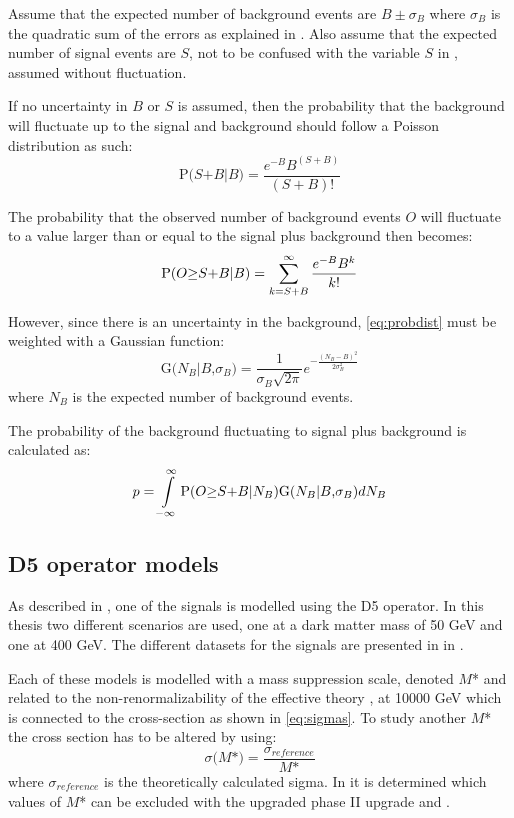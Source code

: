 Assume that the expected number of background events are $B \pm \sigma_B$ where $\sigma_B$ is the quadratic sum of the errors as explained in . Also assume that the expected number of signal events are $S$, not to be confused with the variable $S$ in , assumed without fluctuation. 

If no uncertainty in $B$ or $S$ is assumed, then the probability that the background will fluctuate up to the signal and background should follow a Poisson distribution as such:
\begin{equation}
\text{P($S$+$B$|$B$)}=\frac{e^{-B}B^{(S+B)}}{(S+B)!}
\end{equation} 

The probability that the observed number of background events $O$ will fluctuate to a value larger than or equal to the signal plus background then becomes:
\begin{equation}\label{eq:probdist}
\text{P($O$$ \geq$$S$+$B$|$B$)} =\sum_{k=S+B}^{\infty}  \frac{e^{-B}B^k}{k!}
\end{equation} 

However, since there is an uncertainty in the background, \eqref{eq:probdist} must be weighted with a Gaussian function:
\begin{equation}
 \text{G($N_B$|$B$,$\sigma_B$)}=\frac{1}{\sigma_B \sqrt{2 \pi}} e^{-\frac{(N_B-B)^2}{2\sigma_B^2}}
\end{equation}
where $N_B$ is the expected number of background events. 

The probability of the background fluctuating to signal plus background is calculated as:
\begin{equation}
p = \int\limits_{-\infty}^{\infty} \text{P($O$$ \geq$$S$+$B$|$N_B$)G($N_B$|$B$,$\sigma_B$)} dN_B
\end{equation}

\subsection{D5 operator models}\label{sec:signal:subsec:d5}
As described in , one of the signals is modelled using the D5 operator. In this thesis two different scenarios are used, one at a dark matter mass of 50 GeV and one at 400 GeV. The different datasets for the signals are presented in  in .

Each of these models is modelled with a mass suppression scale, denoted $M$* and related to the non-renormalizability of the effective theory \citep{Goodman:2010}, at 10000 GeV which is connected to the cross-section as shown in \eqref{eq:sigmas}. To study another $M$* the cross section has to be altered by using:
\begin{equation}\label{eq:sigmas}
\sigma \text{($M$*)} = \frac{\sigma_{reference}}{\text{$M$*}} 
\end{equation}
where $\sigma_{reference}$ is the theoretically calculated sigma.
In  it is determined which values of $M$* can be excluded with the upgraded \abbrLHC phase II upgrade and \abbrATLAS .

